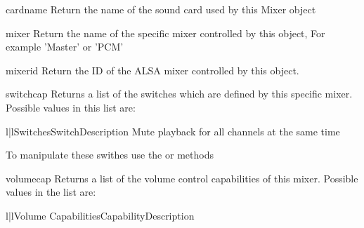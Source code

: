 \begin{methoddesc}[Mixer]{cardname}{}
  Return the name of the sound card used by this Mixer object
\end{methoddesc}

\begin{methoddesc}[Mixer]{mixer}{}
  Return the name of the specific mixer controlled by this object, For
  example 'Master' or 'PCM'
\end{methoddesc}

\begin{methoddesc}[Mixer]{mixerid}{}
  Return the ID of the ALSA mixer controlled by this object.
\end{methoddesc}

\begin{methoddesc}[Mixer]{switchcap}{}
  Returns a list of the switches which are defined by this specific
  mixer. Possible values in this list are:

\begin{tableii}{l|l}{Switches}{Switch}{Description}
  {Mute playback for all channels at the same time}
\end{tableii}

To manipulate these swithes use the  or
 methods
\end{methoddesc}

\begin{methoddesc}[Mixer]{volumecap}{}
  Returns a list of the volume control capabilities of this mixer.
  Possible values in the list are:

\begin{tableii}{l|l}{Volume Capabilities}{Capability}{Description}
\end{tableii}

\end{methoddesc}


